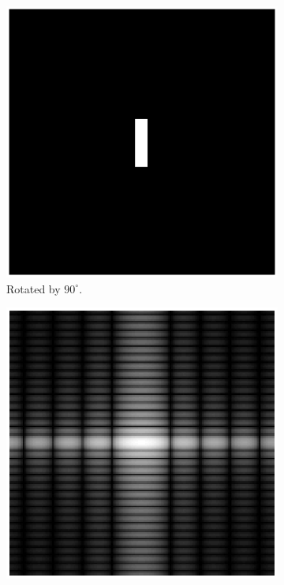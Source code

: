 \documentclass[11pt,a4paper]{article}
\begin{document}
\begin{itemize}
\begin{figure}[!ht]
		\begin{subfigure}[t]{.32\linewidth} %
		\includegraphics[width=\columnwidth]{Rotation_G_90.eps}
		\caption{\scriptsize Rotated by $90^{\circ}$.}
		\label{fig:rotated90}
		\end{subfigure}
		\begin{subfigure}[t]{.32\linewidth} %
		\includegraphics[width=\columnwidth]{Rotation_G_90_Shifted_Fourier.eps}

\end{subfigure}
\end{figure}
\end{itemize}
\end{document}

